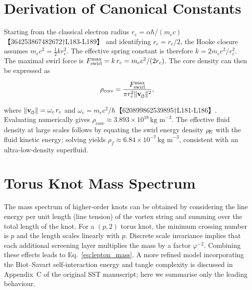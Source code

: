 \documentclass[11pt]{article}
\newcommand{\vnorm}{\lVert \mathbf{v}_{\mkern-2mu\scriptscriptstyle\boldsymbol{\circlearrowleft}} \rVert}  %
\newcommand{\rhoF}{\rho_{\!f}}\newcommand{\rhof}{\rho_{\!f}}     %
\newcommand{\rc}{r_c}                                    %
\newcommand{\rhocore}{\rho_{\text{core}}}
\newcommand{\phiG}{\varphi}
\newcommand{\me}{m_e}
\begin{document}
\section{Derivation of Canonical Constants}


\label{app:constants}


Starting from the classical electron radius $r_e = \alpha\hbar/(\me c)$【364253867482672†L183-L189】 and identifying $\rc = r_e/2$, the Hooke closure assumes $m_e c^2 = \tfrac{1}{2} k r_e^2$.  The effective spring constant is therefore $k = 2 m_e c^2/r_e^2$.  The maximal swirl force is $F_{\rm swirl}^{\max} = k\,\rc = m_e c^2/(2\rc)$.  The core density can then be expressed as


\begin{equation}


    \rhocore = \frac{F_{\rm swirl}^{\max}}{\pi \rc^2 \vnorm^2},


\end{equation}


where $\vnorm = \omega_c\,\rc$ and $\omega_c = m_e c^2/\hbar$【620899862539895†L181-L186】.  Evaluating numerically gives $\rhocore \approx 3.893\times 10^{18}\,\text{kg m}^{-3}$.  The effective fluid density at large scales follows by equating the swirl energy density $\rho_{\!E}$ with the fluid kinetic energy; solving yields $\rhoF \approx 6.84\times 10^{-7}\,\text{kg m}^{-3}$, consistent with an ultra‑low‑density superfluid.






\section{Torus Knot Mass Spectrum}


\label{app:knots}


The mass spectrum of higher‑order knots can be obtained by considering the line energy per unit length (line tension) of the vortex string and summing over the total length of the knot.  For a $(p,2)$ torus knot, the minimum crossing number is $p$ and the length scales linearly with $p$.  Discrete scale invariance implies that each additional screening layer multiplies the mass by a factor $\phiG^{-2}$.  Combining these effects leads to Eq.~\eqref{eq:lepton_mass}.  A more refined model incorporating the Biot–Savart self‑interaction energy and tangle complexity is discussed in Appendix~C of the original SST manuscript; here we summarise only the leading behaviour.
\end{document}
